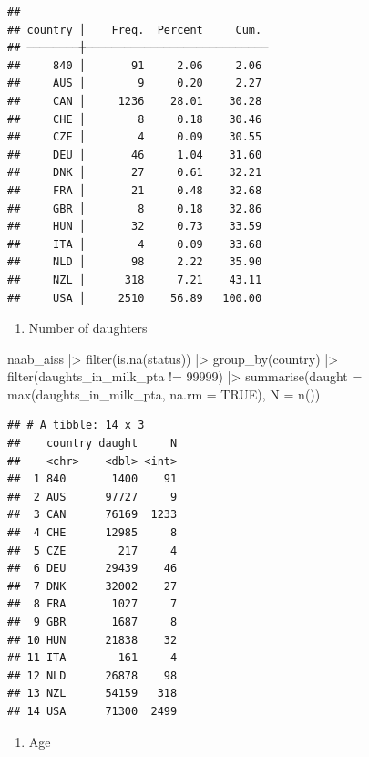 \documentclass[
]{article}
\newenvironment{Shaded}{\begin{snugshade}}{\end{snugshade}}
\newcommand{\AttributeTok}[1]{\textcolor[rgb]{0.77,0.63,0.00}{#1}}
\newcommand{\ConstantTok}[1]{\textcolor[rgb]{0.00,0.00,0.00}{#1}}
\newcommand{\DecValTok}[1]{\textcolor[rgb]{0.00,0.00,0.81}{#1}}
\newcommand{\FunctionTok}[1]{\textcolor[rgb]{0.00,0.00,0.00}{#1}}
\newcommand{\NormalTok}[1]{#1}
\newcommand{\SpecialCharTok}[1]{\textcolor[rgb]{0.00,0.00,0.00}{#1}}
\providecommand{\tightlist}{%
  \setlength{\itemsep}{0pt}\setlength{\parskip}{0pt}}
\begin{document}
\begin{verbatim}
##  
## country │    Freq.  Percent     Cum. 
## ────────┼────────────────────────────
##     840 │       91     2.06     2.06 
##     AUS │        9     0.20     2.27 
##     CAN │     1236    28.01    30.28 
##     CHE │        8     0.18    30.46 
##     CZE │        4     0.09    30.55 
##     DEU │       46     1.04    31.60 
##     DNK │       27     0.61    32.21 
##     FRA │       21     0.48    32.68 
##     GBR │        8     0.18    32.86 
##     HUN │       32     0.73    33.59 
##     ITA │        4     0.09    33.68 
##     NLD │       98     2.22    35.90 
##     NZL │      318     7.21    43.11 
##     USA │     2510    56.89   100.00
\end{verbatim}

\begin{enumerate}
\def\labelenumi{\arabic{enumi}.}
\setcounter{enumi}{1}
\tightlist
\item
  Number of daughters
\end{enumerate}

\begin{Shaded}
\begin{Highlighting}[]
\NormalTok{naab\_aiss }\SpecialCharTok{|\textgreater{}}
  \FunctionTok{filter}\NormalTok{(}\FunctionTok{is.na}\NormalTok{(status)) }\SpecialCharTok{|\textgreater{}}
  \FunctionTok{group\_by}\NormalTok{(country) }\SpecialCharTok{|\textgreater{}}
  \FunctionTok{filter}\NormalTok{(daughts\_in\_milk\_pta }\SpecialCharTok{!=} \DecValTok{99999}\NormalTok{) }\SpecialCharTok{|\textgreater{}} 
  \FunctionTok{summarise}\NormalTok{(}\AttributeTok{daught =} \FunctionTok{max}\NormalTok{(daughts\_in\_milk\_pta, }\AttributeTok{na.rm =} \ConstantTok{TRUE}\NormalTok{),  }\AttributeTok{N =} \FunctionTok{n}\NormalTok{())}
\end{Highlighting}
\end{Shaded}

\begin{verbatim}
## # A tibble: 14 x 3
##    country daught     N
##    <chr>    <dbl> <int>
##  1 840       1400    91
##  2 AUS      97727     9
##  3 CAN      76169  1233
##  4 CHE      12985     8
##  5 CZE        217     4
##  6 DEU      29439    46
##  7 DNK      32002    27
##  8 FRA       1027     7
##  9 GBR       1687     8
## 10 HUN      21838    32
## 11 ITA        161     4
## 12 NLD      26878    98
## 13 NZL      54159   318
## 14 USA      71300  2499
\end{verbatim}

\begin{enumerate}
\def\labelenumi{\arabic{enumi}.}
\setcounter{enumi}{2}
\tightlist
\item
  Age
\end{enumerate}
\end{document}
